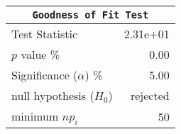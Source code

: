 \begin{enumerate}
\begin{table}[H]
\begin{minipage}{0.4\textwidth}
		\end{minipage}
		\begin{minipage}{0.4\textwidth}
			\centering
			\begin{tabular}{@{}lr@{}}
				\toprule
				\multicolumn{2}{c}{\texttt{Goodness of Fit Test}} \\
				\midrule
				Test Statistic             &  2.31e+01 \\
				$p$ value \%               &      0.00 \\
				Significance ($\alpha$) \% &      5.00 \\
				null hypothesis ($H_0$)    &  rejected \\
				minimum $n p_i$            &        50 \\
				\bottomrule
			\end{tabular}
			
		\end{minipage}
	\end{table}
	\bigskip
\end{enumerate}

